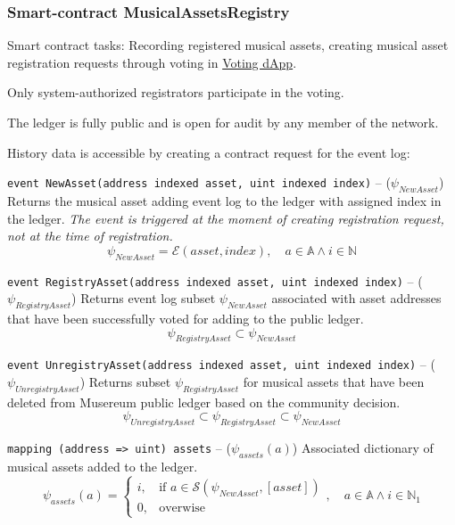 \documentclass[12pt]{report}
\def\code#1{\colorbox{light-gray}{\texttt{#1}}}
\begin{document}
\subsubsection{Smart-contract MusicalAssetsRegistry}
\label{tech-apps-assets-registry}
\begin{multicols}{2}
Smart contract tasks: Recording registered musical assets, creating musical asset registration requests through voting in \hyperref[tech-apps-voting]{Voting dApp}.

Only system-authorized registrators participate in the voting.

The ledger is fully public and is open for audit by any member of the network.

History data is accessible by creating a contract request for the event log:
\end{multicols}

\code{event NewAsset(address indexed asset, uint indexed index)} – ($\psi_{NewAsset}$)\hfill\null\linebreak
Returns the musical asset adding event log  to the ledger with assigned index in the ledger.
\textit{The event is triggered at the moment of creating registration request, not at the time of registration.}
\begin{equation}
\psi_{NewAsset} = \mathcal{E}(asset, index), \quad a \in \mathbb{A} \wedge i \in \mathbb{N}
\end{equation}

\code{event RegistryAsset(address indexed asset, uint indexed index)} – ($\psi_{RegistryAsset}$)\hfill\null\linebreak
Returns event log subset $\psi_{NewAsset}$ associated with asset addresses that have been successfully voted for adding to the public ledger.
\begin{equation}
\psi_{RegistryAsset} \subset \psi_{NewAsset}
\end{equation}

\code{event UnregistryAsset(address indexed asset, uint indexed index)} – ($\psi_{UnregistryAsset}$)\hfill\null\linebreak
Returns subset $\psi_{RegistryAsset}$ for musical assets that have been deleted from Musereum public ledger based on the community decision.
\begin{equation}
\psi_{UnregistryAsset} \subset \psi_{RegistryAsset} \subset \psi_{NewAsset}
\end{equation}

\code{mapping (address => uint) assets} – ($\psi_{assets}(a)$)\hfill\null\linebreak
Associated dictionary of musical assets added to the ledger. 
\begin{equation}
\psi_{assets}(a) = \begin{cases}
	i, & \text{if } a \in \mathcal{S}(\psi_{NewAsset}, [{asset}]) \\
	0, & \text{overwise}
\end{cases}, \quad a \in \mathbb{A} \wedge i \in \mathbb{N}_1
\end{equation}
\end{document}
